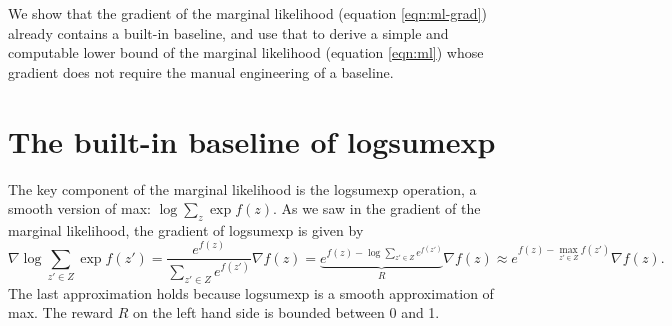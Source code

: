 \documentclass[12pt]{article}
\begin{document}
We show that the gradient of the marginal likelihood (equation \ref{eqn:ml-grad}) already contains
a built-in baseline, and use that to derive a simple and computable lower bound of the marginal likelihood
(equation \ref{eqn:ml}) whose gradient does not require the manual engineering of a baseline.

\section{The built-in baseline of logsumexp}
The key component of the marginal likelihood is the logsumexp operation,
a smooth version of max: $\log \sum_z \exp f(z)$.
As we saw in the gradient of the marginal likelihood, the gradient of logsumexp is given by
$$
\nabla \log \sum_{z'\in Z} \exp f(z')
= \frac{e^{f(z)}}{\sum_{z' \in Z} e^{f(z')}} \nabla f(z)
= \underbrace{e^{f(z) - \log \sum_{z' \in Z} e^{f(z')}}}_{R} \nabla f(z)
\approx e^{f(z) - \max_{z' \in Z} f(z')} \nabla f(z).
$$
The last approximation holds because logsumexp is a smooth approximation of max.
The reward $R$ on the left hand side is bounded between 0 and 1.
\end{document}
